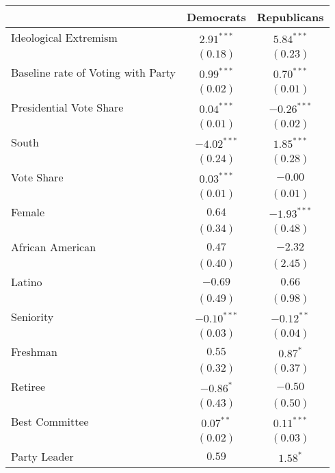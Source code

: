 \documentclass[12pt]{article}
\begin{document}
\begin{table}
	\begin{center}
		\begin{tabular}{l c c }
			\hline
			& Democrats & Republicans \\
			\hline
			Ideological Extremism & $2.91^{***}$  & $5.84^{***}$  \\
			& $(0.18)$      & $(0.23)$      \\
			Baseline rate of Voting with Party              & $0.99^{***}$  & $0.70^{***}$  \\
			& $(0.02)$      & $(0.01)$      \\
			Presidential Vote Share                  & $0.04^{***}$  & $-0.26^{***}$ \\
			& $(0.01)$      & $(0.02)$      \\
			South                     & $-4.02^{***}$ & $1.85^{***}$  \\
			& $(0.24)$      & $(0.28)$      \\
			Vote Share                   & $0.03^{***}$  & $-0.00$       \\
			& $(0.01)$      & $(0.01)$      \\
			Female                    & $0.64$        & $-1.93^{***}$ \\
			& $(0.34)$      & $(0.48)$      \\
			African American                      & $0.47$        & $-2.32$       \\
			& $(0.40)$      & $(2.45)$      \\
			Latino                    & $-0.69$       & $0.66$        \\
			& $(0.49)$      & $(0.98)$      \\
			Seniority                 & $-0.10^{***}$ & $-0.12^{**}$  \\
			& $(0.03)$      & $(0.04)$      \\
			Freshman                  & $0.55$        & $0.87^{*}$    \\
			& $(0.32)$      & $(0.37)$      \\
			Retiree                     & $-0.86^{*}$   & $-0.50$       \\
			& $(0.43)$      & $(0.50)$      \\
			Best Committee               & $0.07^{**}$   & $0.11^{***}$  \\
			& $(0.02)$      & $(0.03)$      \\
			Party Leader                    & $0.59$        & $1.58^{*}$    \\

\end{tabular}
\end{center}
\end{table}
\end{document}
